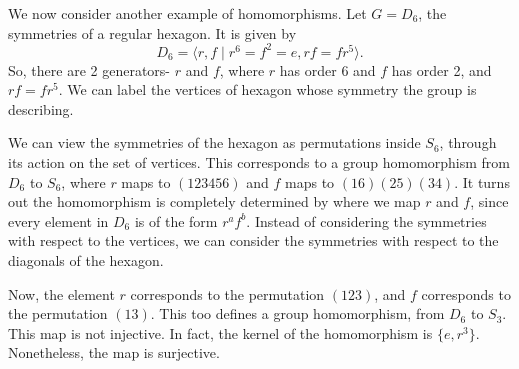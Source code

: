 \documentclass[a4paper, openany]{memoir}
\theoremstyle{definition}
\theoremstyle{plain}
\begin{document}
We now consider another example of homomorphisms. Let $G = D_6$, the symmetries of a regular hexagon. It is given by
\[D_6 = \langle r, f \mid r^6 = f^2 = e, rf = fr^5 \rangle.\]
So, there are 2 generators- $r$ and $f$, where $r$ has order 6 and $f$ has order 2, and $rf = fr^5$. We can label the vertices of hexagon whose symmetry the group is describing.
\begin{figure}[H]
    \centering
\end{figure}
\noindent We can view the symmetries of the hexagon as permutations inside $S_6$, through its action on the set of vertices. This corresponds to a group homomorphism from $D_6$ to $S_6$, where $r$ maps to $(123456)$ and $f$ maps to $(16)(25)(34)$. It turns out the homomorphism is completely determined by where we map $r$ and $f$, since every element in $D_6$ is of the form $r^a f^b$. Instead of considering the symmetries with respect to the vertices, we can consider the symmetries with respect to the diagonals of the hexagon.
\begin{figure}[H]
    \centering
\end{figure}
\noindent Now, the element $r$ corresponds to the permutation $(123)$, and $f$ corresponds to the permutation $(13)$. This too defines a group homomorphism, from $D_6$ to $S_3$. This map is not injective. In fact, the kernel of the homomorphism is $\{e, r^3\}$. Nonetheless, the map is surjective.
\end{document}
